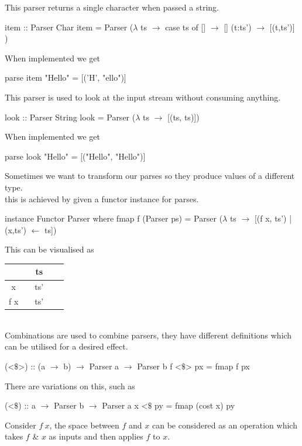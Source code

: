 \documentclass[11pt,a4paper]{article}
\begin{document}
This parser returns a single character when passed a string.
\begin{code}
item :: Parser Char
item = Parser ($\lambda$ ts $\to$ case ts of
                [] $\to$ []
                (t:ts') $\to$ [(t,ts')]
              )
\end{code}
When implemented we get
\begin{code}
parse item "Hello" = [('H', "ello")]
\end{code}

This parser is used to look at the input stream without consuming anything.
\begin{code}
look :: Parser String
look = Parser ($\lambda$ ts $\to$ [(ts, ts)])
\end{code}
When implemented we get
\begin{code}
parse look "Hello" = [("Hello", "Hello")]
\end{code}

Sometimes we want to transform our parses so they produce values of a different type.\\
this is achieved by given a functor instance for parses.
\begin{code}
instance Functor Parser where
  fmap f (Parser ps) = Parser ($\lambda$ ts $\to$ [(f x, ts') | (x,ts') $\leftarrow$ ts])
\end{code}
This can be visualised as\\
\begin{tabular}{|ccccc|}
\hline
&&ts&&\\
\hline
x&\vline&ts'&&\\
\hline
f x&\vline&ts'&&\\
\hline
\end{tabular}\\

Combinations are used to combine parsers, they have different definitions which can be utilised for a desired effect.
\begin{code}
(<$\mathdollar$>) :: (a $\to$ b) $\to$ Parser a $\to$ Parser b
f <$\mathdollar$> px = fmap f px
\end{code}
There are variations on this, such as
\begin{code}
(<$\mathdollar$) :: a $\to$ Parser b $\to$ Parser a
x <$\mathdollar$ py = fmap (cost x) py
\end{code}

Consider $f\ x$, the space between $f$ and $x$ can be considered as an operation which takes $f$ \& $x$ as inputs and then applies $f$ to $x$.\\
\end{document}
